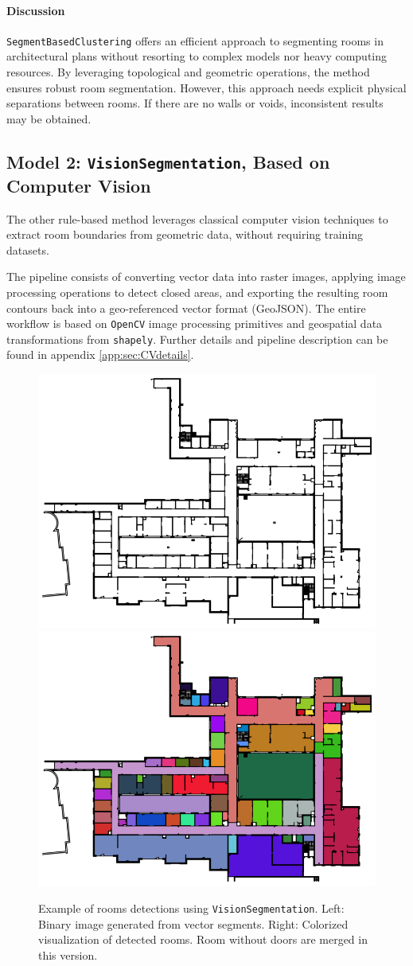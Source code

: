 \documentclass[11pt]{article}
\begin{document}
\paragraph{Discussion} \texttt{SegmentBasedClustering} offers an efficient approach to segmenting 
rooms in architectural plans without resorting to complex models nor heavy 
computing resources. By leveraging 
topological and geometric operations, the method ensures robust room segmentation.
However, this approach needs explicit physical separations between rooms. 
If there are no walls or voids, inconsistent results may be obtained.


\subsection{Model 2: \texttt{VisionSegmentation}, Based on Computer Vision}

The other rule-based method leverages classical computer 
vision techniques to extract room boundaries from 
geometric data, without requiring training datasets.

The pipeline consists of converting vector data into raster images, applying 
image processing operations to detect closed areas, and exporting the resulting 
room contours back into a geo-referenced vector format (GeoJSON). The entire 
workflow is based on \texttt{OpenCV} image processing primitives and geospatial data 
transformations from \texttt{shapely}. Further details and pipeline description 
can be found in appendix \ref{app:sec:CVdetails}. 

\begin{figure}[htp!]
    \centering
    \includegraphics[width=0.48\linewidth]{figures/01.binary_image.png}
    \hfill
    \includegraphics[width=0.48\linewidth]{figures/02.contours_image.png}
    \caption{Example of rooms detections using \texttt{VisionSegmentation}. 
    Left: Binary image generated from vector segments. 
    Right: Colorized visualization of detected rooms. Room without doors are merged in this version.}
    \label{fig:geojson_and_colored}
\end{figure}
\end{document}
